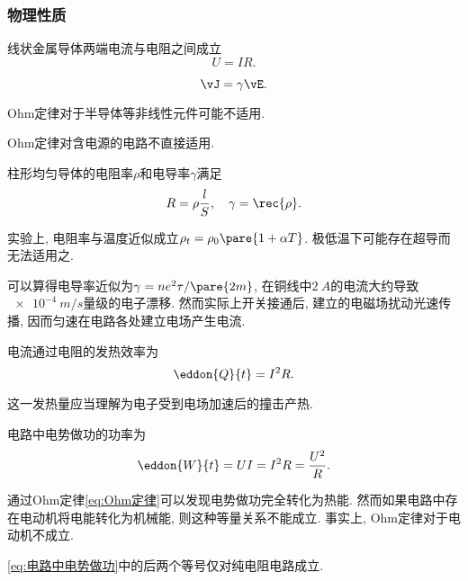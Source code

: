 \documentclass[../Electromagnetism.tex]{subfiles}
\begin{document}

\subsubsection{物理性质} %
\label{ssub:物理性质}

\begin{finale}
	\begin{axiom}[Ohm定律]
		线状金属导体两端电流与电阻之间成立
		\begin{equation}
			\label{eq:Ohm定律}
			U = IR.
		\end{equation}
	\end{axiom}
\end{finale}
\begin{corollary}[Ohm定律的微分形式]\quad
	\[ \vJ = \gamma \vE. \]
\end{corollary}
\begin{remark}
	Ohm定律对于半导体等非线性元件可能不适用.
\end{remark}
\begin{pitfall}
	Ohm定律对含电源的电路不直接适用.
\end{pitfall}
\begin{definition}[电阻率和电导率]
	柱形均匀导体的电阻率$\rho$和电导率$\gamma$满足
	\[ R = \rho\frac{l}{S},\quad \gamma = \rec{\rho}. \]
\end{definition}
\begin{remark}
	实验上, 电阻率与温度近似成立$\rho_t = \rho_0\pare{1+\alpha T}$. 极低温下可能存在超导而无法适用之.
\end{remark}
\begin{remark}
	可以算得电导率近似为$\gamma = ne^2\tau/\pare{2m}$, 在铜线中$\SI{2}{A}$的电流大约导致$\SI{e-4}{m/s}$量级的电子漂移. 然而实际上开关接通后, 建立的电磁场扰动光速传播, 因而匀速在电路各处建立电场产生电流.
\end{remark}
\begin{finale}
	\begin{axiom}[Joule定律]
		电流通过电阻的发热效率为
		\[ \eddon{Q}{t} = I^2R. \]
	\end{axiom}
\end{finale}
\begin{remark}
	这一发热量应当理解为电子受到电场加速后的撞击产热.
\end{remark}
\begin{corollary}[电路中电势做功]
	电路中电势做功的功率为
	\begin{equation}
		\label{eq:电路中电势做功}
		\eddon{W}{t} = UI = I^2R = \frac{U^2}{R}.
	\end{equation}
\end{corollary}
\begin{remark}
	通过Ohm定律\eqref{eq:Ohm定律}可以发现电势做功完全转化为热能. 然而如果电路中存在电动机将电能转化为机械能, 则这种等量关系不能成立. 事实上, Ohm定律对于电动机不成立.
\end{remark}
\begin{pitfall}
	\eqref{eq:电路中电势做功}中的后两个等号仅对纯电阻电路成立.
\end{pitfall}
\end{document}
